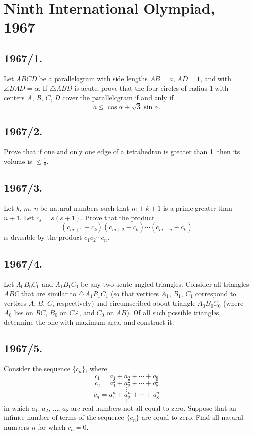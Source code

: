 \documentclass{article}
\begin{document}
\section*{Ninth International Olympiad, 1967}

\subsection*{1967/1.}
Let $ABCD$ be a parallelogram with side lengths $AB = a$, $AD = 1$, and with $\angle BAD = \alpha$. If $\triangle ABD$ is acute, prove that the four circles of radius 1 with centers $A$, $B$, $C$, $D$ cover the parallelogram if and only if
\[
	a \leq \cos \alpha + \sqrt{3} \sin \alpha.
\]

\subsection*{1967/2.}
Prove that if one and only one edge of a tetrahedron is greater than 1, then its volume is $\leq \frac{1}{8}$.

\subsection*{1967/3.}
Let $k$, $m$, $n$ be natural numbers such that $m + k + 1$ is a prime greater than $n + 1$. Let $c_s = s(s + 1)$. Prove that the product
\[
	(c_{m+1} - c_k)(c_{m+2} - c_k) \cdots (c_{m+n} - c_k)
\]
is divisible by the product $c_1 c_2 \cdots c_n$.

\subsection*{1967/4.}
Let $A_0B_0C_0$ and $A_1B_1C_1$ be any two acute-angled triangles. Consider all triangles $ABC$ that are similar to $\triangle A_1B_1C_1$ (so that vertices $A_1$, $B_1$, $C_1$ correspond to vertices $A$, $B$, $C$, respectively) and circumscribed about triangle $A_0B_0C_0$ (where $A_0$ lies on $BC$, $B_0$ on $CA$, and $C_0$ on $AB$). Of all such possible triangles, determine the one with maximum area, and construct it.

\subsection*{1967/5.}
Consider the sequence $\{c_n\}$, where
\[
	c_1 = a_1 + a_2 + \cdots + a_8
\]
\[
	c_2 = a_1^2 + a_2^2 + \cdots + a_8^2
\]
\[
	\vdots
\]
\[
	c_n = a_1^n + a_2^n + \cdots + a_8^n
\]
\[
	\vdots
\]
in which $a_1$, $a_2$, $\ldots$, $a_8$ are real numbers not all equal to zero. Suppose that an infinite number of terms of the sequence $\{c_n\}$ are equal to zero. Find all natural numbers $n$ for which $c_n = 0$.
\end{document}
